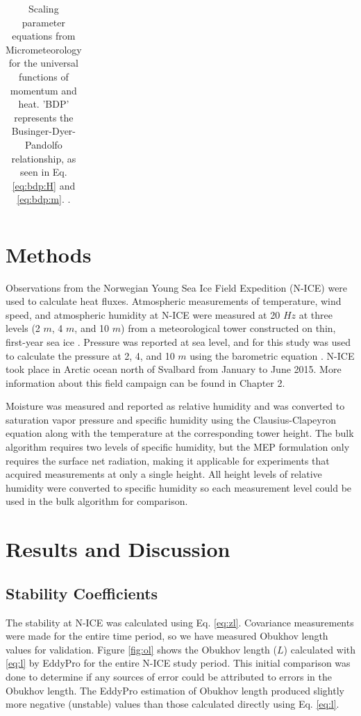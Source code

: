 {\begin{table}[p]
\begin{tabular}{| c | c |}
        \hline
    \end{tabular}
    \caption{Scaling parameter equations from Micrometeorology \citep{foken:2008} for the universal functions of momentum and heat. 'BDP' represents the Businger-Dyer-Pandolfo relationship, as seen in Eq. \ref{eq:bdp:H} and \ref{eq:bdp:m}. \citep{foken:2008}.}
    \label{tab:stability}
\end{table}}

\section{Methods}
Observations from the Norwegian Young Sea Ice Field Expedition (N-ICE) 
 were used to calculate heat fluxes. Atmospheric measurements of temperature, wind speed, and atmospheric humidity at N-ICE were measured at 20 $Hz$ at three levels (2 $m$, 4 $m$, and 10 $m$) from a meteorological tower constructed on thin, first-year sea ice \citep{walden:2017}. Pressure was reported at sea level, and for this study was used to calculate the pressure at 2, 4, and 10 $m$ using the barometric equation \citep{lente:2020}. N-ICE took place in Arctic ocean north of Svalbard from January to June 2015. More information about this field campaign can be found in Chapter 2.
 
 Moisture was measured and reported as relative humidity and was converted to saturation vapor pressure and specific humidity using the Clausius-Clapeyron equation \citep{iribarne:1981} along with the temperature at the corresponding tower height. The bulk algorithm requires two levels of specific humidity, but the MEP formulation only requires the surface net radiation, making it applicable for experiments that acquired measurements at only a single height. All height levels of relative humidity were converted to specific humidity so each measurement level could be used in the bulk algorithm for comparison. 

\section{Results and Discussion}

\subsection{Stability Coefficients}
The stability at N-ICE was calculated using Eq. \ref{eq:zl}. Covariance measurements were made for the entire time period, so we have measured Obukhov length values for validation. Figure \ref{fig:ol} shows the Obukhov length ($L$) calculated with \ref{eq:l} by EddyPro for the entire N-ICE study period. This initial comparison was done to determine if any sources of error could be attributed to errors in the Obukhov length. The EddyPro estimation of Obukhov length produced slightly more negative (unstable) values than those calculated directly using Eq. \ref{eq:l}. 

